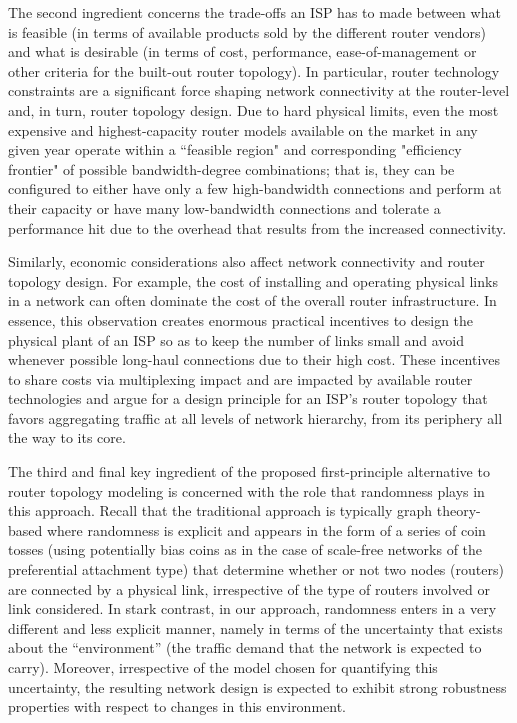 The second ingredient concerns the trade-offs an ISP has to made between what is
feasible (in terms of available products sold by the different router vendors) and
what is desirable (in terms of cost, performance, ease-of-management or other 
criteria for the built-out router topology). In particular, router technology 
constraints are a significant force shaping network connectivity at the router-level
and, in turn, router topology design. Due to hard physical limits, even the most 
expensive and highest-capacity router models available on the market in any given
year operate within a ``feasible region" and corresponding "efficiency frontier"
of possible bandwidth-degree combinations; that is, they can be configured to either
have only a few high-bandwidth connections and perform at their capacity or have
many low-bandwidth connections and tolerate a performance hit due to the overhead that
results from the increased connectivity. 

Similarly, economic considerations also
affect network connectivity and router topology design. For example, the cost of 
installing and operating physical links in a network can often dominate the cost of 
the overall router infrastructure. In essence, this observation creates enormous 
practical incentives to design the physical plant of an ISP so as to keep the number
of links small and avoid whenever possible long-haul connections due to their high
cost.  These incentives to share costs via multiplexing impact and are impacted by
available router technologies and argue for a design principle for an ISP's router
topology that favors aggregating traffic at all levels of network hierarchy, from
its periphery all the way to its core. 

The third and final key ingredient of the proposed first-principle alternative to 
router topology modeling is concerned with the role that randomness plays in this
approach. Recall that the traditional approach is typically graph theory-based where
randomness is explicit and appears in the form of a series of coin tosses (using 
potentially bias coins as in the case of scale-free networks of the preferential 
attachment type) that determine whether or not two nodes (\ie routers) are connected
by a physical link, irrespective of the type of routers involved or link considered.
In stark contrast, in our approach, randomness enters in a very different and
less explicit manner, namely in terms of the uncertainty that exists about the 
``environment'' (\ie the traffic demand that the network is expected to carry).
Moreover, irrespective of the model chosen for quantifying this uncertainty, the
resulting network design is expected to exhibit strong robustness properties with 
respect to changes in this environment.

